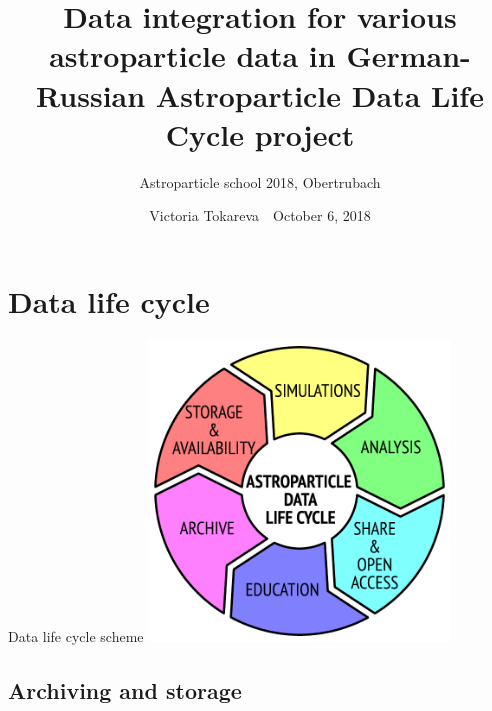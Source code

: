 \documentclass[18pt]{beamer}
\title[Cosmic rays data center based on KCDC]{Data integration for various astroparticle data in German-Russian Astroparticle Data Life Cycle project}
\subtitle{Astroparticle school 2018, Obertrubach}
\author[Victoria Tokareva]{
  Victoria Tokareva~\textbar~October 6, 2018
}
\institute{Institute for Nuclear Physics (IKP)}
\begin{document}



\section{Data life cycle}

\begin{frame}{Data life cycle scheme}
\centering
\includegraphics[width=0.6\textwidth]{pics/ADLC.pdf}
\end{frame}

\subsection{Archiving and storage}
\end{document}
